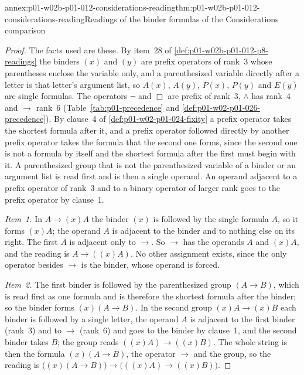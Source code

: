 \begin{annexitem}{annex:p01-w02b-p01-012-considerations-reading}{thm:p01-w02b-p01-012-considerations-reading}{Readings of the binder formulas of the Considerations comparison}
\begin{proof}
The facts used are these.  By item~28 of
\cref{def:p01-w02b-p01-012-p8-readings} the binders \((x)\) and \((y)\)
are prefix operators of rank~3 whose parentheses enclose the variable only,
and a parenthesized variable directly after a letter is that letter's
argument list, so \(A(x)\), \(A(y)\), \(P(x)\), \(P(y)\) and \(E(y)\) are
single formulas.  The operators \(\neg\) and \(\Box\) are prefix of
rank~3, \(\land\) has rank~4 and \(\to\) rank~6
(Table~\ref{tab:p01-precedence} and \cref{def:p01-w02-p01-026-precedence}).  By clause~4 of
\cref{def:p01-w02-p01-024-fixity} a prefix operator takes the shortest
formula after it, and a prefix operator followed directly by another
prefix operator takes the formula that the second one forms, since the
second one is not a formula by itself and the shortest formula after the
first must begin with it.  A parenthesized group that is not the
parenthesized variable of a binder or an argument list is read first and
is then a single operand.  An operand adjacent to a prefix operator of
rank~3 and to a binary operator of larger rank goes to the prefix operator
by clause~1.

\emph{Item~1.}  In \(A\to(x)A\) the binder \((x)\) is followed by the
single formula \(A\), so it forms \((x)A\); the operand \(A\) is adjacent
to the binder and to nothing else on its right.  The first \(A\) is
adjacent only to \(\to\).  So \(\to\) has the operands \(A\) and
\((x)A\), and the reading is \(A\to((x)A)\).  No other assignment exists,
since the only operator besides \(\to\) is the binder, whose operand is
forced.

\emph{Item~2.}  The first binder is followed by the parenthesized group
\((A\to B)\), which is read first as one formula and is therefore the
shortest formula after the binder; so the binder forms \((x)(A\to B)\).
In the second group \((x)A\to(x)B\) each binder is followed by a single
letter, the operand \(A\) is adjacent to the first binder (rank~3) and to
\(\to\) (rank~6) and goes to the binder by clause~1, and the second binder
takes \(B\); the group reads \(((x)A)\to((x)B)\).  The whole string is then
the formula \((x)(A\to B)\), the operator \(\to\) and the group, so the
reading is \(\bigl((x)(A\to B)\bigr)\to\bigl(((x)A)\to((x)B)\bigr)\).


\end{proof}
\end{annexitem}
